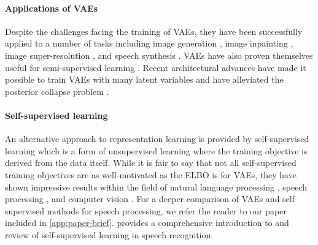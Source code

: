 \paragraph{Applications of VAEs}
Despite the challenges facing the training of VAEs, they have been successfully applied to a number of tasks including image generation \parencite{kingma_autoencoding_2014,rezende_stochastic_2014}, image inpainting \parencite{pathak_context_2016}, image super-resolution \parencite{sonderby_amortised_2017,chira_image_2022}, and speech synthesis \parencite{hsu_unsupervised_2017,hsu_hierarchical_2019}. 
VAEs have also proven themselves useful for semi-supervised learning \parencite{kingma_semi-supervised_2014,kingma_improved_2016,maaloe_biva_2019}. Recent architectural advances have made it possible to train VAEs with many latent variables \parencite{sonderby_ladder_2016,vahdat_nvae_2020,child_very_2021} and have alleviated the posterior collapse problem \parencite{maaloe_biva_2019}.


\paragraph{Self-supervised learning}
An alternative approach to representation learning is provided by self-supervised learning \parencite{mikolov_efficient_2013,devlin_bert_2018,chen_simple_2020,schneider_wav2vec_2019} which is a form of unsupervised learning where the training objective is derived from the data itself. 
While it is fair to say that not all self-supervised training objectives are as well-motivated as the ELBO is for VAEs, they have shown impressive results within the field of natural language processing \parencite{devlin_bert_2018,chen_simple_2020}, speech processing \parencite{schneider_wav2vec_2019}, and computer vision \parencite{chen_simple_2020}. 
For a deeper comparison of VAEs and self-supervised methods for speech processing, we refer the reader to our paper \textcite{borgholt_brief_2022} included in \cref{app:paper-brief}. 
 provides a comprehensive introduction to and review of self-supervised learning in speech recognition. 

